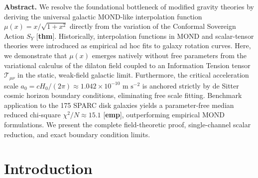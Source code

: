 \documentclass[11pt]{article}
\theoremstyle{definition}
\theoremstyle{remark}
\begin{document}
\begin{center}
\end{center}
\vspace{0.5em}

\begin{mdframed}[style=codex]
\noindent\textbf{\color{gold}Abstract.} 
We resolve the foundational bottleneck of modified gravity theories by deriving the universal galactic MOND-like interpolation function $\mu(x) = x / \sqrt{1+x^2}$ directly from the variation of the Conformal Sovereign Action $S_Y$ [\textbf{thm}]. Historically, interpolation functions in MOND and scalar-tensor theories were introduced as empirical ad hoc fits to galaxy rotation curves. Here, we demonstrate that $\mu(x)$ emerges natively without free parameters from the variational calculus of the dilaton field coupled to an Information Tension tensor $\mathcal{T}_{\mu\nu}$ in the static, weak-field galactic limit. Furthermore, the critical acceleration scale $a_0 = c H_0 / (2\pi) \approx 1.042 \times 10^{-10}\text{ m s}^{-2}$ is anchored strictly by de Sitter cosmic horizon boundary conditions, eliminating free scale fitting. Benchmark application to the 175 SPARC disk galaxies yields a parameter-free median reduced chi-square $\chi^2/N \approx 15.1$ [\textbf{emp}], outperforming empirical MOND formulations. We present the complete field-theoretic proof, single-channel scalar reduction, and exact boundary condition limits.
\end{mdframed}

\section{Introduction}
\end{document}
